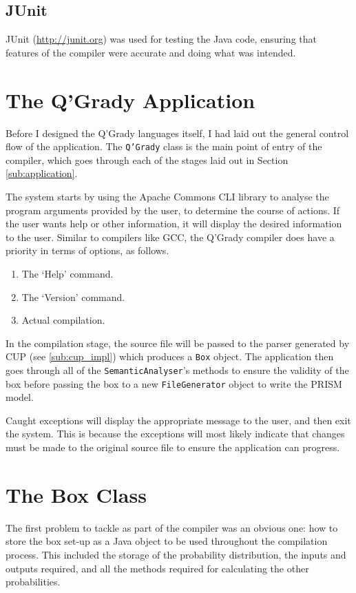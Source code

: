 \documentclass[report.tex]{subfiles}
\begin{document}
\subsection{JUnit} %
\label{sub:junit}
JUnit (\url{http://junit.org}) was used for testing the Java code, ensuring that
features of the compiler were accurate and doing what was intended.


\section{The Q'Grady Application} %
\label{sec:the_q_grady_application}
Before I designed the Q'Grady languages itself, I had laid out the general
control flow of the application. The \texttt{Q'Grady} class is the main point of
entry of the compiler, which goes through each of the stages laid out in Section
\ref{sub:application}.

The system starts by using the Apache Commons CLI library to analyse the
program arguments provided by the user, to determine the course of actions. If
the user wants help or other information, it will display the desired
information to the user. Similar to compilers like GCC, the Q'Grady compiler
does have a priority in terms of options, as follows.
\begin{enumerate}
    \item The `Help' command.
    \item The `Version' command.
    \item Actual compilation.
\end{enumerate}

In the compilation stage, the source file will be passed to the parser generated
by CUP (see \ref{sub:cup_impl}) which produces a \texttt{Box} object. The
application then goes through all of the \texttt{SemanticAnalyser}'s methods to
ensure the validity of the box before passing the box to a new
\texttt{FileGenerator} object to write the PRISM model. 

Caught exceptions will display the appropriate message to the user, and then
exit the system. This is because the exceptions will most likely indicate that
changes must be made to the original source file to ensure the application can
progress.

\section{The Box Class} %
\label{sec:the_box_class}
The first problem to tackle as part of the compiler was an obvious one: how to
store the box set-up as a Java object to be used throughout the compilation
process. This included the storage of the probability distribution, the inputs
and outputs required, and all the methods required for calculating the other
probabilities.
\end{document}
